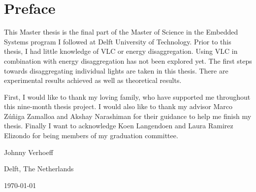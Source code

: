 
\chapter*{Preface}



This Master thesis is the final part of the Master of Science in the Embedded Systems program I followed at Delft University of Technology.
Prior to this thesis, I had little knowledge of VLC or energy disaggregation.
Using VLC in combination with energy disaggregation has not been explored yet.
The first steps towards disaggregating individual lights are taken in this thesis.
There are experimental results achieved as well as theoretical results.







\vspace{1\baselineskip}

\noindent



First, I would like to thank my loving family, who have supported me throughout this nine-month thesis project.
I would also like to thank my advisor Marco Z\'u\~niga Zamalloa and Akshay Narashiman for their guidance to help me finish my thesis.
Finally I want to acknowledge Koen Langendoen and Laura Ramirez Elizondo for being members of my graduation committee.







\vspace{1\baselineskip}

\noindent
Johnny Verhoeff

\vspace{1\baselineskip}

\noindent
Delft, The Netherlands

\noindent
\today
